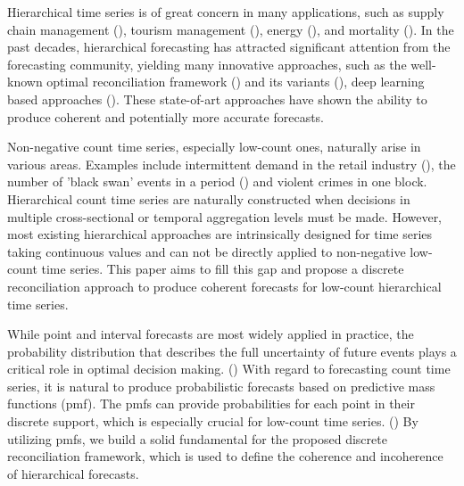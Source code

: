 \documentclass[a4paper,review,12pt,authoryear]{elsarticle}
\begin{document}
Hierarchical time series is of great concern in many applications, such as supply chain management (\citealp{babaiDemandForecastingSupply2022}), tourism management (\citealp{kourentzesCrosstemporalCoherentForecasts2019}), energy (\citealp{nystrupTemporalHierarchiesAutocorrelation2020}), and mortality (\citealp{liHierarchicalMortalityForecasting2022}).
In the past decades, hierarchical forecasting has attracted significant attention from the forecasting community, yielding many innovative approaches, such as the well-known optimal reconciliation framework (\citealp{hyndmanOptimalCombinationForecasts2011, wickramasuriyaOptimalForecastReconciliation2019, panagiotelisProbabilisticForecastReconciliation2022}) and its variants (), deep learning based approaches (\citealp{rangapuramEndtoEndLearningCoherent2021}).
These state-of-art approaches have shown the ability to produce coherent and potentially more accurate forecasts.

Non-negative count time series, especially low-count ones, naturally arise in various areas. 
Examples include intermittent demand in the retail industry (\citealp{kourentzesElucidateStructureIntermittent2021}), the number of 'black swan' events in a period (\citealp{nikolopoulosWeNeedTalk2020}) and violent crimes in one block.
Hierarchical count time series are naturally constructed when decisions in multiple cross-sectional or temporal aggregation levels must be made.
However, most existing hierarchical approaches are intrinsically designed for time series taking continuous values and can not be directly applied to non-negative low-count time series. 
This paper aims to fill this gap and propose a discrete reconciliation approach to produce coherent forecasts for low-count hierarchical time series.

While point and interval forecasts are most widely applied in practice, 
the probability distribution that describes the full uncertainty of future events plays a critical role in optimal decision making. (\citealp{gneitingProbabilisticForecasting2014}) 
With regard to forecasting count time series, it is natural to produce probabilistic forecasts based on predictive mass functions (pmf). 
The pmfs can provide probabilities for each point in their discrete support,
which is especially crucial for low-count time series. (\citealp{petropoulosForecastingTheoryPractice2022a})
By utilizing pmfs, we build a solid fundamental for the proposed discrete reconciliation framework, which is used to define the coherence and incoherence of hierarchical forecasts.
\end{document}
